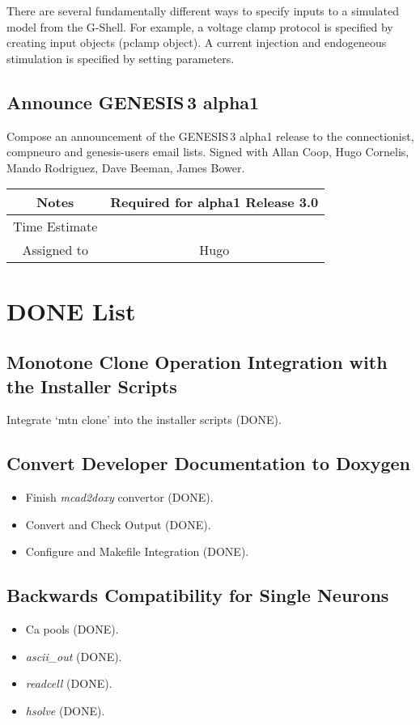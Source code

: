 \documentclass[12pt]{article}
\begin{document}
There are several fundamentally different ways to specify inputs to a
simulated model from the G-Shell.  For example, a voltage clamp
protocol is specified by creating input objects (pclamp object).  A
current injection and endogeneous stimulation is specified by setting
parameters.


\subsection{Announce GENESIS\,3 alpha1}

Compose an announcement of the GENESIS\,3 alpha1 release to the
connectionist, compneuro and genesis-users email lists.  Signed with
Allan Coop, Hugo Cornelis, Mando Rodriguez, Dave Beeman, James Bower.

{
  \vspace{5mm}
  \centering
  \begin{tabular}{|c|c|}
    \hline
    Notes
    & Required for alpha1 Release 3.0 \\
    \hline
    Time Estimate
    & \\
    \hline
    Assigned to
    & Hugo \\
    \hline
  \end{tabular}
}


\section{DONE List}

\subsection{Monotone Clone Operation Integration with the Installer Scripts}
Integrate `mtn clone' into the installer scripts (DONE).

\subsection{Convert Developer Documentation to Doxygen}

\begin{itemize}
\item Finish {\it mcad2doxy} convertor (DONE).
\item Convert and Check Output (DONE).
\item Configure and Makefile Integration (DONE).
\end{itemize}

\subsection{Backwards Compatibility for Single Neurons}

\begin{itemize}
\item Ca pools (DONE).
\item {\it ascii\_out} (DONE).
\item {\it readcell} (DONE).
\item {\it hsolve} (DONE).
\end{itemize}
\end{document}
